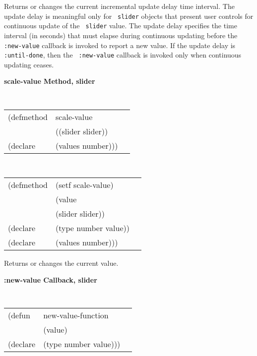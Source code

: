\begin{flushright} \parbox[t]{6.125in}{ Returns or changes the current
incremental update delay time interval.  The update delay is meaningful only for
{\tt
slider} objects that present user controls for continuous update of the {\tt
slider} value. The update delay specifies the time interval (in seconds) that
must elapse during continuous updating before the {\tt :new-value} callback is
invoked to report a new value. If the update delay is {\tt :until-done}, then the {\tt
:new-value} callback is invoked only when continuous updating ceases.}
\end{flushright}



{\samepage  
{\large {\bf scale-value \hfill Method, slider}}
\begin{flushright} \parbox[t]{6.125in}{
\tt
\begin{tabular}{lll}
\raggedright
(defmethod & scale-value & \\
& ((slider  slider)) \\
(declare & (values number)))
\end{tabular}
\rm

}\end{flushright}}

\begin{flushright} \parbox[t]{6.125in}{
\tt
\begin{tabular}{lll}
\raggedright
(defmethod & (setf scale-value) & \\
         & (value \\
         & (slider  slider)) \\
(declare &(type number  value))\\
(declare & (values number)))
\end{tabular}
\rm}
\end{flushright}

\begin{flushright} \parbox[t]{6.125in}{
Returns or changes the current value.}
\end{flushright}


\pagebreak




{\samepage
{\large {\bf :new-value \hfill Callback, slider}} 
\begin{flushright} 
\parbox[t]{6.125in}{
\tt
\begin{tabular}{lll}
\raggedright
(defun & new-value-function & \\ 
& (value) \\
(declare &(type  number  value)))
\end{tabular}
\rm

}\end{flushright}}

